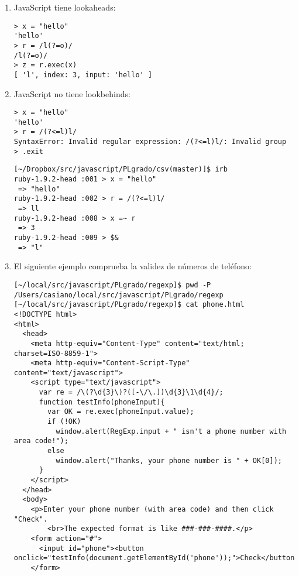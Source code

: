 \begin{enumerate}
\begin{verbatim}
> re = /d(b+)(d)/ig
/d(b+)(d)/gi
> z = "dBdxdbbdzdbd"
'dBdxdbbdzdbd'
> result = re.exec(z)
[ 'dBd', 'B', 'd', index: 0, input: 'dBdxdbbdzdbd' ]
> re.lastIndex
3
> result = re.exec(z)
[ 'dbbd', 'bb', 'd', index: 4, input: 'dBdxdbbdzdbd' ]
> re.lastIndex
8
> result = re.exec(z)
[ 'dbd', 'b', 'd', index: 9, input: 'dBdxdbbdzdbd' ]
> re.lastIndex
12
> z.length
12
> result = re.exec(z)
null
\end{verbatim}
\item JavaScript tiene lookaheads:
\begin{verbatim}
> x = "hello"
'hello'
> r = /l(?=o)/
/l(?=o)/
> z = r.exec(x)
[ 'l', index: 3, input: 'hello' ]
\end{verbatim}
\item JavaScript no tiene lookbehinds:
\begin{verbatim}
> x = "hello"
'hello'
> r = /(?<=l)l/
SyntaxError: Invalid regular expression: /(?<=l)l/: Invalid group
> .exit
\end{verbatim}
\begin{verbatim}
[~/Dropbox/src/javascript/PLgrado/csv(master)]$ irb
ruby-1.9.2-head :001 > x = "hello"
 => "hello" 
ruby-1.9.2-head :002 > r = /(?<=l)l/
 => ll 
ruby-1.9.2-head :008 > x =~ r
 => 3 
ruby-1.9.2-head :009 > $&
 => "l" 
\end{verbatim}
\item 
El siguiente ejemplo comprueba la validez de números de teléfono:
\begin{verbatim}
[~/local/src/javascript/PLgrado/regexp]$ pwd -P
/Users/casiano/local/src/javascript/PLgrado/regexp
[~/local/src/javascript/PLgrado/regexp]$ cat phone.html
<!DOCTYPE html>
<html>  
  <head>  
    <meta http-equiv="Content-Type" content="text/html; charset=ISO-8859-1">  
    <meta http-equiv="Content-Script-Type" content="text/javascript">  
    <script type="text/javascript">  
      var re = /\(?\d{3}\)?([-\/\.])\d{3}\1\d{4}/;  
      function testInfo(phoneInput){  
        var OK = re.exec(phoneInput.value);  
        if (!OK)  
          window.alert(RegExp.input + " isn't a phone number with area code!");  
        else
          window.alert("Thanks, your phone number is " + OK[0]);  
      }  
    </script>  
  </head>  
  <body>  
    <p>Enter your phone number (with area code) and then click "Check".
        <br>The expected format is like ###-###-####.</p>
    <form action="#">  
      <input id="phone"><button onclick="testInfo(document.getElementById('phone'));">Check</button>
    </form>  

\end{verbatim}
\end{enumerate}
